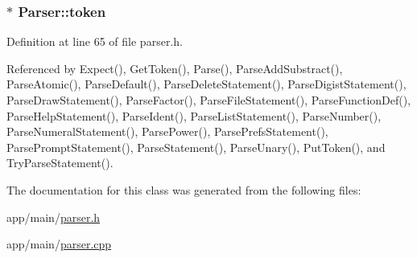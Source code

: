 \subsubsection[{\texorpdfstring{token}{token}}]{$\ast$ Parser\+::token\hspace{0.3cm}{\ttfamily [private]}}\hypertarget{classParser_a467028559d31c5b33f16ca8be56715cc}{}\label{classParser_a467028559d31c5b33f16ca8be56715cc}


Definition at line 65 of file parser.\+h.



Referenced by Expect(), Get\+Token(), Parse(), Parse\+Add\+Substract(), Parse\+Atomic(), Parse\+Default(), Parse\+Delete\+Statement(), Parse\+Digist\+Statement(), Parse\+Draw\+Statement(), Parse\+Factor(), Parse\+File\+Statement(), Parse\+Function\+Def(), Parse\+Help\+Statement(), Parse\+Ident(), Parse\+List\+Statement(), Parse\+Number(), Parse\+Numeral\+Statement(), Parse\+Power(), Parse\+Prefs\+Statement(), Parse\+Prompt\+Statement(), Parse\+Statement(), Parse\+Unary(), Put\+Token(), and Try\+Parse\+Statement().



The documentation for this class was generated from the following files\+:\begin{DoxyCompactItemize}
\item 
app/main/\hyperlink{parser_8h}{parser.\+h}\item 
app/main/\hyperlink{parser_8cpp}{parser.\+cpp}\end{DoxyCompactItemize}
